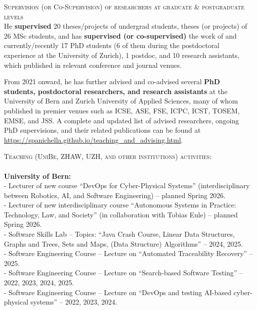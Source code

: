 \documentclass[11pt]{article}
\begin{document}
 
\medskip \medskip
\textsc{Supervision (or Co-Supervision) of researchers at graduate \& postgraduate levels}
\medskip \\
He \textbf{supervised} 20 theses/projects of undergrad students, theses (or projects) of 26 MSc students, and has \textbf{supervised (or co-supervised)} the work of and currently/recently 17 PhD students (6 of them during the postdoctoral experience at the University of Zurich), 1 postdoc, and 10 research assistants, which published in relevant conference and journal venues. 

From 2021 onward, he has further advised and co-advised several \textbf{PhD students, postdoctoral researchers, and research assistants} at the University of Bern and Zurich University of Applied Sciences, many of whom published in premier venues such as ICSE, ASE, FSE, ICPC, ICST, TOSEM, EMSE, and JSS. A complete and updated list of advised researchers, ongoing PhD supervisions, and their related publications can be found at
\href{https://spanichella.github.io/teaching_and_advising.html}{https://spanichella.github.io/teaching\_and\_advising.html}.

\textsc{Teaching (UniBe, ZHAW, UZH, and other institutions) activities:}
 \\
\\
\textbf{University of Bern:}
\medskip \\
- Lecturer of new course ``DevOps for Cyber-Physical Systems'' (interdisciplinary between Robotics, AI, and Software Engineering) – planned Spring 2026.\\
- Lecturer of new interdisciplinary course ``Autonomous Systems in Practice: Technology, Law, and Society'' (in collaboration with Tobias Eule) – planned Spring 2026.\\
- Software Skills Lab – Topics: ``Java Crash Course, Linear Data Structures, Graphs and Trees, Sets and Maps, (Data Structure) Algorithms'' – 2024, 2025.\\
- Software Engineering Course – Lecture on ``Automated Traceability Recovery'' – 2025.\\
- Software Engineering Course – Lecture on ``Search-based Software Testing'' – 2022, 2023, 2024, 2025.\\
- Software Engineering Course – Lecture on ``DevOps and testing AI-based cyber-physical systems'' – 2022, 2023, 2024.\\
 
\end{document}
